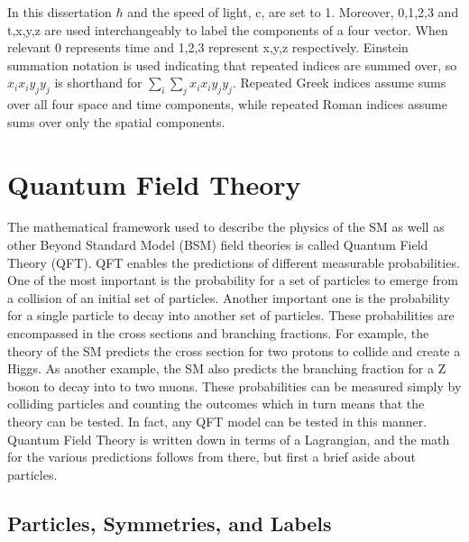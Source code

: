 In this dissertation $\hbar$ and the speed of light, c, are set to 1. Moreover, 0,1,2,3 and t,x,y,z are used interchangeably to label the components of a four vector. When relevant 0 represents time and 1,2,3 represent x,y,z respectively. Einstein summation notation is used indicating that repeated indices are summed over, so $x_ix_i y_jy_j$ is shorthand for $\sum_i\sum_j x_ix_i y_jy_j$. Repeated Greek indices assume sums over all four space and time components, while repeated Roman indices assume sums over only the spatial components. 

\section{Quantum Field Theory}

The mathematical framework used to describe the physics of the SM as well as other Beyond Standard Model (BSM) field theories is called Quantum Field Theory (QFT). QFT enables the predictions of different measurable probabilities. One of the most important is the probability for a set of particles to emerge from a collision of an initial set of particles. Another important one is the probability for a single particle to decay into another set of particles. These probabilities are encompassed in the cross sections and branching fractions. For example, the theory of the SM predicts the cross section for two protons to collide and create a Higgs. As another example, the SM also predicts the branching fraction for a Z boson to decay into to two muons. These probabilities can be measured simply by colliding particles and counting the outcomes which in turn means that the theory can be tested. In fact, any QFT model can be tested in this manner. Quantum Field Theory is written down in terms of a Lagrangian, and the math for the various predictions follows from there, but first a brief aside about particles. 

\subsection{Particles, Symmetries, and Labels}

